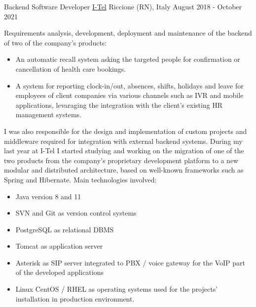 \begin{cventries}
\cventry
    {Backend Software Developer} %
    {\href{https://i-tel.it}{I-Tel}} %
    {Riccione (RN), Italy} %
    {August 2018 - October 2021} %
    {
      	Requirements analysis, development, deployment and maintenance of the backend of two of the company's products:
      	\begin{itemize}
      		\item {An automatic recall system asking the targeted people for confirmation or cancellation of health care bookings.}
      		\item {A system for reporting clock-in/out, absences, shifts, holidays and leave for employees of client companies via various channels such as IVR and mobile applications, levaraging the integration with the client's existing HR management systems.}
      	\end{itemize}
      	I was also responsible for the design and implementation of custom projects and middleware required for integration with external backend systems.
      	During my last year at I-Tel I started studying and working on the migration of one of the two products from the company's proprietary development platform to a new modular and distributed architecture, based on well-known frameworks such as Spring and Hibernate.
      	Main technologies involved:
      	\begin{itemize}
      		\item {Java version 8 and 11}
      		\item {SVN and Git as version control systems}
      		\item {PostgreSQL as relational DBMS}
      		\item {Tomcat as application server}
      		\item {Asterisk as SIP server integrated to PBX / voice gateway for the VoIP part of the developed applications}
      		\item {Linux CentOS / RHEL as operating systems used for the projects' installation in production environment.}
      	\end{itemize}
    }



\end{cventries}
